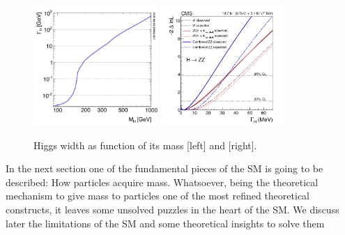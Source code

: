 \begin{figure}[!Hhtbp]
  \begin{center}
    \includegraphics[width=0.42\textwidth]{figs/u0g5o.png}
    \includegraphics[width=0.42\textwidth]{figs/AllFitPaper_30_04_14_MeV.png}
    \caption{Higgs width as function of its mass [left] and  [right].}
    \label{fig:WidthHiggs}
  \end{center}
\end{figure}

In the next section one of the fundamental pieces of the SM is going to be described: How particles acquire mass. Whatsoever, being the theoretical mechanism to give mass to particles one of the most refined theoretical constructs, it leaves some unsolved puzzles in the heart of the SM. We discuss later the limitations of the SM and some theoretical insights to solve them 



